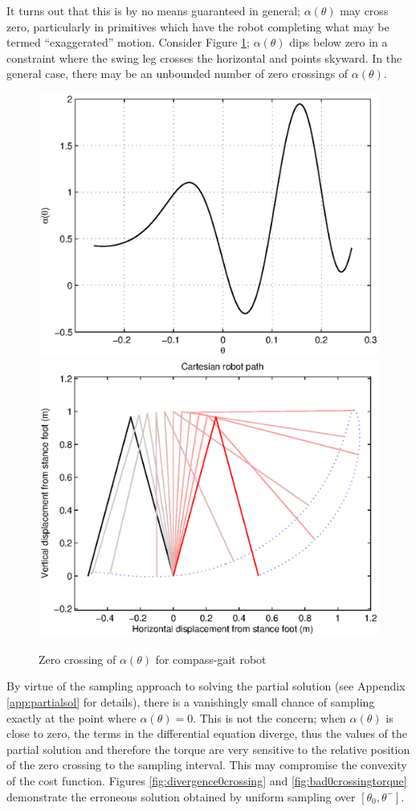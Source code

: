 It turns out that this is by no means guaranteed in general; $\alpha(\theta)$ may cross zero, particularly in primitives which have the robot completing what may be termed ``exaggerated'' motion. Consider Figure \ref{fig:alphazerocrossing}; $\alpha(\theta)$ dips below zero in a constraint where the swing leg crosses the horizontal and points skyward. In the general case, there may be an unbounded number of zero crossings of $\alpha(\theta)$.

\begin{figure}
	\centering
	\includegraphics[width=0.49\linewidth]{4VirtConstLib/al0Crossing.eps}
	\includegraphics[width=0.49\linewidth]{4VirtConstLib/xy-0Crossing.eps}
	\caption{Zero crossing of $\alpha(\theta)$ for compass-gait robot}
	\label{fig:alphazerocrossing}
\end{figure}

 By virtue of the sampling approach to solving the partial solution (see Appendix \ref{app:partialsol} for details), there is a vanishingly small chance of sampling exactly at the point where $\alpha(\theta)=0$. This is not the concern; when $\alpha(\theta)$ is close to zero, the terms in the differential equation diverge, thus the values of the partial solution and therefore the torque are very sensitive to the relative position of the zero crossing to the sampling interval. This may compromise the convexity of the cost function. Figures \ref{fig:divergence0crossing} and \ref{fig:bad0crossingtorque} demonstrate the erroneous solution obtained by uniform sampling over $[\theta_0, \theta^-]$.
 
